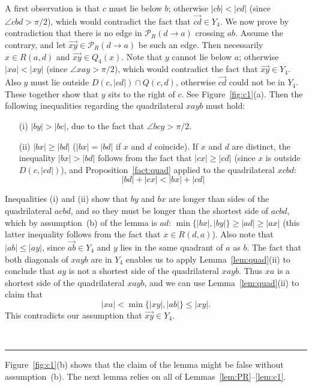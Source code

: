 \pdfoutput=1  \documentclass[11pt]{article}
\newcommand{\qed}{\rule{0.5em}{1.5ex}}
\newcommand{\fqed}{{\hfill~\qed}}
\newenvironment{proof}{{\noindent \bf Proof.}}
                      {{\hfill \fqed} \vspace{1em}}
\newcommand{\Pa}{{\mathcal P}}
\begin{document}
\begin{proof}
A first observation is that $c$ must lie below $b$; otherwise $|cb| < |cd|$
(since $\angle cbd > \pi/2$), which would contradict the fact that
$\overrightarrow{cd} \in Y_4$. We now prove by contradiction that there
is no edge in $\Pa_R(d \rightarrow a)$ crossing $ab$.
Assume the contrary, and let $\overrightarrow{xy} \in \Pa_R(d \rightarrow a)$
be such an edge. Then necessarily $x \in R(a, d)$ and
$\overrightarrow{xy} \in Q_4(x)$. Note that $y$ cannot lie below $a$;
otherwise $|xa| < |xy|$
(since $\angle xay > \pi/2$), which would contradict the fact that
$\overrightarrow{xy} \in Y_4$.
Also $y$ must lie outside $D(c, |cd|) \cap Q(c, d)$, otherwise
$\overrightarrow{cd}$ could not be in $Y_4$. These together show that $y$
sits to the right of $c$. See Figure~\ref{fig:c1}(a).
Then the following inequalities regarding the quadrilateral $xayb$
must hold:
\begin{itemize}
\item[(i)] $|by| > |bc|$, due to the fact that
$\angle{bcy} > \pi/2$.
\item[(ii)] $|bx| \ge |bd|$ ($|bx| = |bd|$ if $x$ and $d$ coincide).
If $x$ and $d$ are distinct, the inequality $|bx| > |bd|$ follows from
the fact that $|cx| \ge |cd|$ (since $x$ is outside $D(c, |cd|)$),
and
Proposition~\ref{fact:quad}
applied to the quadrilateral $xcbd$:
\[
  |bd| + |cx| < |bx| + |cd|
\]
\end{itemize}
Inequalities (i) and (ii) show that $by$ and $bx$ are longer
than sides of the quadrilateral $acbd$, and so they must be longer
than the shortest side of $acbd$, which by assumption~(b) of the lemma
is $ad$:
$\min\{|bx|, |by|\} \ge |ad| \ge |ax|$ (this latter inequality follows
from the fact that $x \in R(d, a)$). Also note that $|ab| \le |ay|$,
since $\overrightarrow{ab} \in Y_4$ and $y$ lies in the same quadrant
of $a$ as $b$. The fact that both diagonals of $xayb$ are in $Y_4$
enables us to apply Lemma~\ref{lem:quad}(ii) to conclude that
$ay$ is not a shortest side of the quadrilateral $xayb$. Thus
$xa$ is a shortest side of the quadrilateral $xayb$, and we can use
Lemma~\ref{lem:quad}(ii) to claim that
\[
|xa| < \min\{|xy|, |ab|\} \le |xy|.
\]
This contradicts our assumption that $\overrightarrow{xy} \in Y_4$.
\end{proof}

\noindent
Figure~\ref{fig:c1}(b) shows that the claim of the lemma might be false without
assumption~(b).
The next lemma relies on all of Lemmas~\ref{lem:PR}--\ref{lem:c1}.
\end{document}
